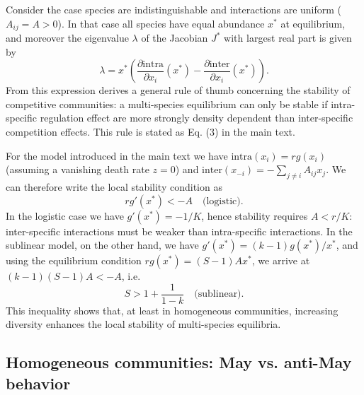 \documentclass[12pt]{article}
\newcommand{\inter}{\textrm{inter}}
\newcommand{\intra}{\textrm{intra}}
\begin{document}
Consider the case species are indistinguishable and interactions are uniform ($A_{ij} = A>0$). In that case all species have equal abundance $x^*$ at equilibrium, and moreover the eigenvalue $\lambda$ of the Jacobian $J^*$ with largest real part is given by
\begin{equation}
    \lambda = x^* \left(\frac{\partial \intra}{\partial x_i}(x^*) - \frac{\partial \inter}{\partial x_i}(x^*)\right). 
\end{equation}
From this expression derives a general rule of thumb concerning the stability of competitive communities: a multi-species equilibrium can only be stable if intra-specific regulation effect are more strongly density dependent than inter-specific competition effects. This rule is stated as Eq. (3) in the main text. 

For the model introduced in the main text we have $\intra(x_i) = rg(x_i)$ (assuming a vanishing death rate $z = 0$) and $\inter(x_{-i}) = -\sum_{j\neq i}A_{ij} x_j$. We can therefore write the local stability condition as
\begin{equation}
    rg'(x^*) < - A \quad \textrm{(logistic)}.
\end{equation}
In the logistic case we have $g'(x^*) = -1/K$, hence stability requires $A < r/K$: inter-specific interactions must be weaker than intra-specific interactions. In the sublinear model, on the other hand, we have $g'(x^*) = (k-1)g(x^*)/x^*$, and using the equilibrium condition $rg(x^*) = (S-1)Ax^*$, we arrive at $(k-1)(S-1)A < - A$, i.e. 
\begin{equation}
    S > 1 + \frac{1}{1-k} \quad \textrm{(sublinear)}.
\end{equation}
This inequality shows that, at least in homogeneous communities, increasing diversity enhances the local stability of multi-species equilibria. 

\subsection{Homogeneous communities: May vs. anti-May behavior}
\end{document}
